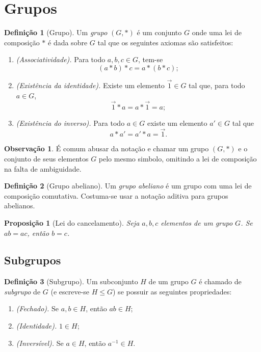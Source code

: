 \documentclass[a4paper,12pt]{report}
\theoremstyle{plain}
\newtheorem{proposicao}{Proposição}[section]
\theoremstyle{definition}
\newtheorem{definicao}{Definição}[section]
\newtheorem{observacao}{Observação}[section]
\begin{document}
\section{Grupos}

\begin{definicao}[Grupo]
	
	Um \emph{grupo} $(G,*)$ é um conjunto \(G\) onde uma lei de
	composição $*$ é dada sobre \(G\) tal que os seguintes axiomas são satisfeitos:
	
	\begin{enumerate}
		\item \emph{(Associatividade).} Para todo $a,b,c \in G$, tem-se $$(a*b)*c = a*(b*c);$$
		\item \emph{(Existência da identidade).} Existe um elemento $\vec{1}\in G$ tal que, para todo $a\in G$, $$\vec{1}*a = a*\vec{1} = a;$$
		\item \emph{(Existência do inverso).} Para todo $a\in G$ existe um elemento $a'\in G$ tal que $$a*a' = a'*a = \vec{1}.$$
	\end{enumerate}
\end{definicao}

\begin{observacao}
	É comum abusar da notação e chamar um grupo $(G,*)$ e o conjunto de	seus elementos $G$ pelo mesmo simbolo, omitindo a lei de composição na falta de ambiguidade.	
\end{observacao}

\begin{definicao}[Grupo abeliano]
	Um \emph{grupo abeliano} é um grupo com uma lei de
	composição comutativa. Costuma-se usar a notação aditiva para grupos
	abelianos.
\end{definicao}

\begin{proposicao}[Lei do cancelamento]
	Seja \(a,b,c\) elementos de um grupo \(G\). Se \(ab = ac\), então \(b = c\).
\end{proposicao} 

\subsection{Subgrupos}

\begin{definicao}[Subgrupo]
	Um subconjunto \(H\) de um grupo \(G\) é chamado de \emph{subgrupo} de \(G\) (e escreve-se $H \leq G$) se possuir as seguintes propriedades:
	
	\begin{enumerate}
		\item \emph{(Fechado).} Se \(a,b\in H\), então \(ab\in H\);
		\item \emph{(Identidade).} \(1\in H\);
		\item \emph{(Inversível).} Se \(a\in H\), então \(a^{-1}\in H\).
	\end{enumerate}
	
\end{definicao}
\end{document}
